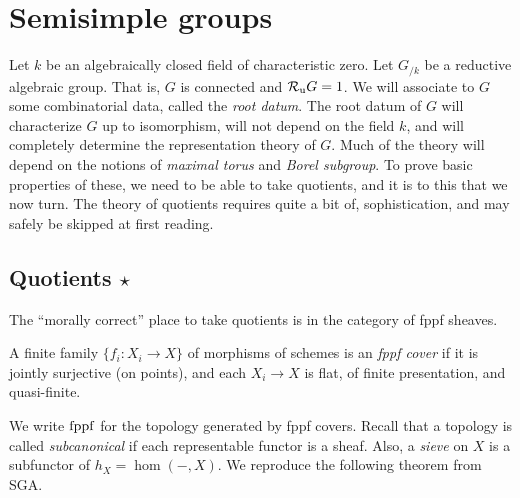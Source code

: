








\section{Semisimple groups}

Let $k$ be an algebraically closed field of characteristic zero. Let 
$G_{/k}$ be a reductive algebraic group. That is, $G$ is connected and 
$\mathcal{R}_\mathrm{u} G=1$. We will associate to $G$ some combinatorial data, called the 
\emph{root datum}. The root datum of $G$ will characterize $G$ up to 
isomorphism, will not depend on the field $k$, and will completely determine 
the representation theory of $G$. Much of the theory will depend on the 
notions of \emph{maximal torus} and \emph{Borel subgroup}. To prove basic 
properties of these, we need to be able to take quotients, and it is to this 
that we now turn. The theory of quotients requires quite a bit of, 
sophistication, and may safely be skipped at first reading. 





\subsection{Quotients \texorpdfstring{$\star$}{*}}

The ``morally correct'' place to take quotients is in the category of 
fppf sheaves. 

\begin{definition}
A finite family $\{f_i:X_i\to X\}$ of morphisms of schemes is an 
\emph{fppf cover} if it is jointly surjective (on points), and each 
$X_i\to X$ is flat, of finite presentation, and quasi-finite. 
\end{definition}

We write $\mathrm{fppf}$ for the topology generated by fppf covers. Recall that a 
topology is called \emph{subcanonical} if each representable functor is a 
sheaf. Also, a \emph{sieve} on $X$ is a subfunctor of $h_X=\hom(-,X)$. 
We reproduce the following theorem from SGA. 

